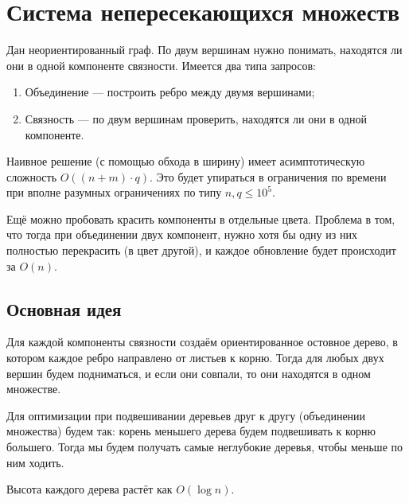 \section{Система непересекающихся множеств}

\begin{problem}
    Дан неориентированный граф. По двум вершинам нужно понимать, находятся ли они в одной компоненте связности. Имеется два типа запросов:
    \begin{enumerate}[nolistsep]
        \item Объединение --- построить ребро между двумя вершинами;
        \item Связность --- по двум вершинам проверить, находятся ли они в одной компоненте.
    \end{enumerate}
\end{problem}

Наивное решение (с помощью обхода в ширину) имеет асимптотическую сложность $O((n + m) \cdot q)$. Это будет упираться в ограничения по времени при вполне разумных ограничениях по типу $n, q \leqslant 10^5$.

Ещё можно пробовать красить компоненты в отдельные цвета. Проблема в том, что тогда при объединении двух компонент, нужно хотя бы одну из них полностью перекрасить (в цвет другой), и каждое обновление будет происходит за $O(n)$.

\subsection{Основная идея}

Для каждой компоненты связности создаём ориентированное остовное дерево, в котором каждое ребро направлено от листьев к корню. Тогда для любых двух вершин будем подниматься, и если они совпали, то они находятся в одном множестве.

Для оптимизации при подвешивании деревьев друг к другу (объединении множества) будем так: корень меньшего дерева будем подвешивать к корню большего. Тогда мы будем получать самые неглубокие деревья, чтобы меньше по ним ходить.

\begin{theorem}
    Высота каждого дерева растёт как $O(\log n)$.
\end{theorem}


